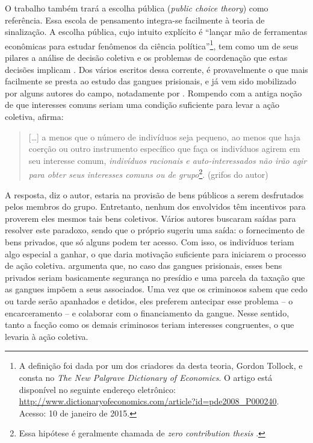 \documentclass[a4paper,11pt]{article}
\begin{document}
O trabalho também trará a escolha pública (\textit{public choice theory}) como referência. Essa escola de pensamento integra-se facilmente à teoria de sinalização. A escolha pública, cujo intuito explícito é ``lançar mão de ferramentas econômicas para estudar fenômenos da ciência política''\footnote{A definição foi dada por um dos criadores da desta teoria, Gordon Tollock, e consta no \textit{The New Palgrave Dictionary of Economics}. O artigo está disponível no seguinte endereço eletrônico: \href{http://www.dictionaryofeconomics.com/article?id=pde2008_P000240}{http://www.dictionaryofeconomics.com/article?id=pde2008\_P000240}. Acesso: 10 de janeiro de 2015.}, tem como um de seus pilares a análise de decisão coletiva e os problemas de coordenação que estas decisões implicam \citep{abrams1980foundations, arrow1951social}. Dos vários escritos dessa corrente, \citet{olson1965logic} é provavelmente o que mais facilmente se presta ao estudo das gangues prisionais, e já vem sido mobilizado por alguns autores do campo, notadamente por \citet{skarbek2011governance, skarbek2014social}. Rompendo com a antiga noção de que interesses comuns seriam uma condição suficiente para levar a ação coletiva, \citet[2]{olson1965logic} afirma: 

\begin{quote}
[\dots] a menos que o número de indivíduos seja pequeno, ao menos que haja coerção ou outro instrumento específico que faça os indivíduos agirem em seu interesse comum, \textit{indivíduos racionais e auto-interessados não irão agir para obter seus interesses comuns ou de grupo}\footnote{Essa hipótese é geralmente chamada de \textit{zero contribution thesis} \citep{ostrom2000crowding}.}. (grifos do autor)
\end{quote}

A resposta, diz o autor, estaria na provisão de bens públicos a serem desfrutados pelos membros do grupo. Entretanto, nenhum dos envolvidos têm incentivos para proverem eles mesmos tais bens coletivos. Vários autores buscaram saídas para resolver este paradoxo, sendo que o próprio \citet{olson1965logic} sugeriu uma saída: o fornecimento de bens privados, que só alguns podem ter acesso. Com isso, os indivíduos teriam algo especial a ganhar, o que daria motivação suficiente para iniciarem o processo de ação coletiva.
\citet{skarbek2011governance} argumenta que, no caso das gangues prisionais, esses bens privados seriam basicamente segurança no presídio e uma parcela da taxação que as gangues impõem a seus associados. Uma vez que os criminosos sabem que cedo ou tarde serão apanhados e detidos, eles preferem antecipar esse problema -- o encarceramento --
e colaborar com o financiamento da gangue. Nesse sentido, tanto a facção como os demais criminosos teriam interesses congruentes, o que levaria à ação coletiva. 
\end{document}

